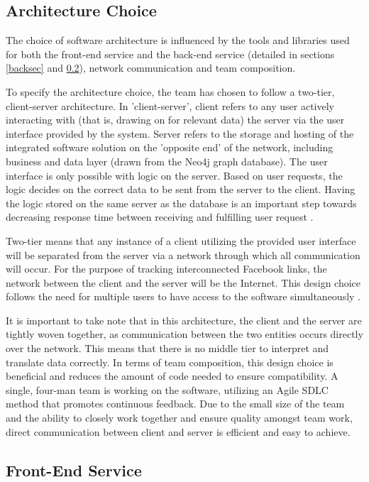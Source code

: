 \documentclass[12pt,onecolumn]{article}
\begin{document}
	
	\subsection{Architecture Choice}
	The choice of software architecture is influenced by the tools and libraries used for both the front-end service and the back-end service (detailed in sections \ref{backsec} and \ref{frontsec}), network communication and team composition. 
	
	To specify the architecture choice, the team has chosen to follow a two-tier, client-server architecture. In 'client-server', client refers to any user actively interacting with (that is, drawing on for relevant data) the server via the user interface provided by the system. Server refers to the storage and hosting of the integrated software solution on the 'opposite end' of the network, including business and data layer (drawn from the Neo4j graph database). The user interface is only possible with logic on the server. Based on user requests, the logic decides on the correct data to be sent from the server to the client. Having the logic stored on the same server as the database is an important step towards decreasing response time between receiving and fulfilling user request \cite{twotieradvantage}. 
	
	Two-tier means that any instance of a client utilizing the provided user interface will be separated from the server via a network through which all communication will occur. For the purpose of tracking interconnected Facebook links, the network between the client and the server will be the Internet. This design choice follows the need for multiple users to have access to the software simultaneously \cite{beginningsofteng}. 
	
	It is important to take note that in this architecture, the client and the server are tightly woven together, as communication between the two entities occurs directly over the network. This means that there is no middle tier to interpret and translate data correctly. In terms of team composition, this design choice is beneficial and reduces the amount of code needed to ensure compatibility. A single, four-man team is working on the software, utilizing an Agile SDLC method that promotes continuous feedback. Due to the small size of the team and the ability to closely work together and ensure quality amongst team work, direct communication between client and server is efficient and easy to achieve.
	
	\subsection{Front-End Service} \label{frontsec}
	
\end{document}
